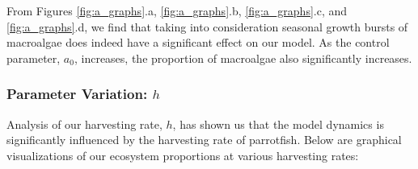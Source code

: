 \documentclass[12pt]{article}
\begin{document}
From Figures \ref{fig:a_graphs}.a, \ref{fig:a_graphs}.b, \ref{fig:a_graphs}.c, and \ref{fig:a_graphs}.d, we find that taking into consideration seasonal growth bursts of macroalgae does indeed have a significant effect on our model. As the control parameter, $a_{0}$, increases, the proportion of macroalgae also significantly increases.\\

\subsubsection{Parameter Variation: $h$}
Analysis of our harvesting rate, $h$, has shown us that the model dynamics is significantly influenced by the harvesting rate of parrotfish. Below are graphical visualizations of our ecosystem proportions at various harvesting rates:\\
\end{document}

